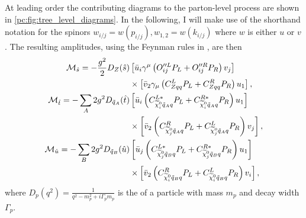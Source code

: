 \documentclass[../main.tex]{subfiles}
\begin{document}
At leading order the contributing diagrams to the parton-level process are
shown in \cref{pc:fig:tree_level_diagrams}. In the following, I will make use
of the shorthand notation for the spinors \(w_{i/j} = w(p_{i/j}), w_{1,2} =
w(k_{i/j})\) where \(w\) is either \(u\) or \(v\). The resulting amplitudes,
using the Feynman rules in , are then
\begin{subequations}
  \begin{align}
    \nonumber
    \M_{\hat{s}} = -\frac{g^2}{2} D_Z(\hat{s})           & \bclosed{ \bar{u}_i\gamma^\mu\pclosed{O^{\prime\prime L}_{ij}P_L + O^{\prime\prime R}_{ij}P_R} v_j }
    \\
    \label{par:eq:Ms}
                                                         & \times \bclosed{ \bar{v}_2 \gamma_\mu \pclosed{C^L_{Zqq}P_L + C^R_{Zqq}P_R} u_1 },
    \\
    \nonumber
    \M_{\hat{t}} = -\sum_A 2g^2 D_{\tilde{q}_A}(\hat{t}) & \bclosed{ \bar{u}_i \pclosed{C_{\nino[i]\tilde{q}_Aq}^{L\ast}P_L + C_{\nino[i]\tilde{q}_Aq}^{R\ast} P_R} u_1 }
    \\
    \label{par:eq:Mt}
                                                         & \times \bclosed{ \bar{v}_2 \pclosed{C^R_{\nino[j]\tilde{q}_Aq}P_L + C^L_{\nino[j]\tilde{q}_Aq}P_R} v_j },
    \\
    \nonumber
    \M_{\hat{u}} = -\sum_B 2g^2 D_{\tilde{q}_B}(\hat{u}) & \bclosed{ \bar{u}_j \pclosed{C_{\nino[j]\tilde{q}_Bq}^{L\ast}P_L + C_{\nino[j]\tilde{q}_Bq}^{R\ast} P_R} u_1 }
    \\
    \label{par:eq:Mu}
                                                         & \times \bclosed{ \bar{v}_2 \pclosed{C^R_{\nino[i]\tilde{q}_Bq}P_L + C^L_{\nino[i]\tilde{q}_Bq}P_R} v_i },
  \end{align}
\end{subequations}
where \(D_p(q^2) = \frac{1}{q^2 - m_p^2 + i\Gamma_p m_p}\) is the
 of a particle with mass \(m_p\) and decay
width \(\Gamma_p\).
\end{document}
